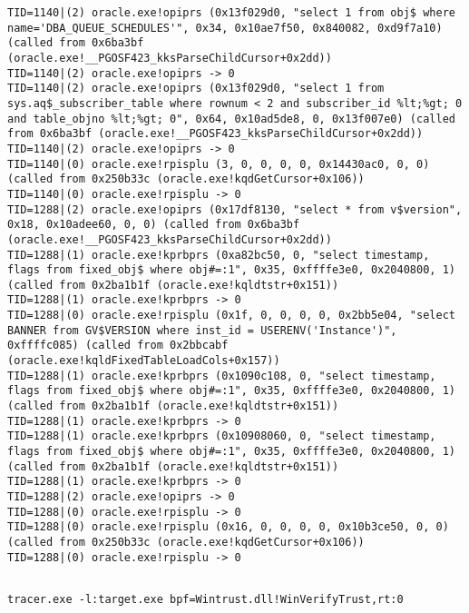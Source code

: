 \begin{lstlisting}
TID=1140|(2) oracle.exe!opiprs (0x13f029d0, "select 1 from obj$ where name='DBA_QUEUE_SCHEDULES'", 0x34, 0x10ae7f50, 0x840082, 0xd9f7a10) (called from 0x6ba3bf (oracle.exe!__PGOSF423_kksParseChildCursor+0x2dd))
TID=1140|(2) oracle.exe!opiprs -> 0
TID=1140|(2) oracle.exe!opiprs (0x13f029d0, "select 1 from sys.aq$_subscriber_table where rownum < 2 and subscriber_id %lt;%gt; 0 and table_objno %lt;%gt; 0", 0x64, 0x10ad5de8, 0, 0x13f007e0) (called from 0x6ba3bf (oracle.exe!__PGOSF423_kksParseChildCursor+0x2dd))
TID=1140|(2) oracle.exe!opiprs -> 0
TID=1140|(0) oracle.exe!rpisplu (3, 0, 0, 0, 0, 0x14430ac0, 0, 0) (called from 0x250b33c (oracle.exe!kqdGetCursor+0x106))
TID=1140|(0) oracle.exe!rpisplu -> 0
TID=1288|(2) oracle.exe!opiprs (0x17df8130, "select * from v$version", 0x18, 0x10adee60, 0, 0) (called from 0x6ba3bf (oracle.exe!__PGOSF423_kksParseChildCursor+0x2dd))
TID=1288|(1) oracle.exe!kprbprs (0xa82bc50, 0, "select timestamp, flags from fixed_obj$ where obj#=:1", 0x35, 0xffffe3e0, 0x2040800, 1) (called from 0x2ba1b1f (oracle.exe!kqldtstr+0x151))
TID=1288|(1) oracle.exe!kprbprs -> 0
TID=1288|(0) oracle.exe!rpisplu (0x1f, 0, 0, 0, 0, 0x2bb5e04, "select  BANNER from GV$VERSION where inst_id = USERENV('Instance')", 0xffffc085) (called from 0x2bbcabf (oracle.exe!kqldFixedTableLoadCols+0x157))
TID=1288|(1) oracle.exe!kprbprs (0x1090c108, 0, "select timestamp, flags from fixed_obj$ where obj#=:1", 0x35, 0xffffe3e0, 0x2040800, 1) (called from 0x2ba1b1f (oracle.exe!kqldtstr+0x151))
TID=1288|(1) oracle.exe!kprbprs -> 0
TID=1288|(1) oracle.exe!kprbprs (0x10908060, 0, "select timestamp, flags from fixed_obj$ where obj#=:1", 0x35, 0xffffe3e0, 0x2040800, 1) (called from 0x2ba1b1f (oracle.exe!kqldtstr+0x151))
TID=1288|(1) oracle.exe!kprbprs -> 0
TID=1288|(2) oracle.exe!opiprs -> 0
TID=1288|(0) oracle.exe!rpisplu -> 0
TID=1288|(0) oracle.exe!rpisplu (0x16, 0, 0, 0, 0, 0x10b3ce50, 0, 0) (called from 0x250b33c (oracle.exe!kqdGetCursor+0x106))
TID=1288|(0) oracle.exe!rpisplu -> 0
\end{lstlisting}

\subsection{}

\begin{lstlisting}
tracer.exe -l:target.exe bpf=Wintrust.dll!WinVerifyTrust,rt:0
\end{lstlisting}

